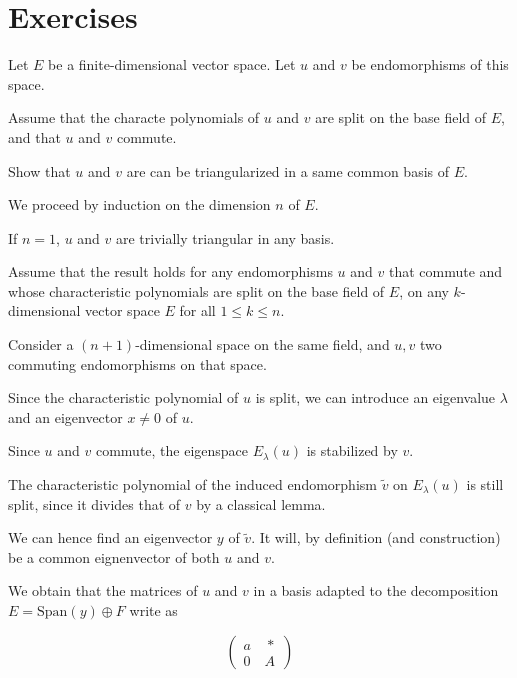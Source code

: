 \section{Exercises}

\begin{exercise}
    Let $ E $ be a finite-dimensional vector space. Let $ u $ and $ v $ be endomorphisms of this space.
    
    Assume that the characte polynomials of $ u $ and $ v $ are split on the base field of $ E $, and that $ u $ and $ v $ commute.

    Show that $ u $ and $ v $ are can be triangularized in a same common basis of $ E $.
\end{exercise}

\begin{solution}
    We proceed by induction on the dimension $ n $ of $ E $.

    If $ n = 1 $, $ u $ and $ v $ are trivially triangular in any basis.

    Assume that the result holds for any endomorphisms $ u $ and $ v $ that commute and whose characteristic polynomials are split on the base field of $ E $, on any $ k $-dimensional vector space $ E $ for all $ 1 \leq k \leq n $.

    Consider a $ (n+1) $-dimensional space on the same field, and $ u,v $ two commuting endomorphisms on that space.

    Since the characteristic polynomial of $ u $ is split, we can introduce an eigenvalue $ \lambda $ and an eigenvector $ x \neq 0 $ of $ u $.

    Since $ u $ and $ v $ commute, the eigenspace $ E_\lambda(u) $ is stabilized by $ v $.

    The characteristic polynomial of the induced endomorphism $ \tilde v $ on $ E_\lambda(u) $ is still split, since it divides that of $ v $ by a classical lemma.

    We can hence find an eigenvector $ y $ of $ \tilde v $. It will, by definition (and construction) be a common eignenvector of both $ u $ and $ v $.

    We obtain that the matrices of $ u $ and $ v $ in a basis adapted to the decomposition $ E = \mathrm{Span}(y) \oplus F $ write as
    
    \[
        \left(
            \begin{array}{cc}
                a \quad * \\
                0 \quad A
            \end{array}
        \right)
    \]
    

\end{solution}

